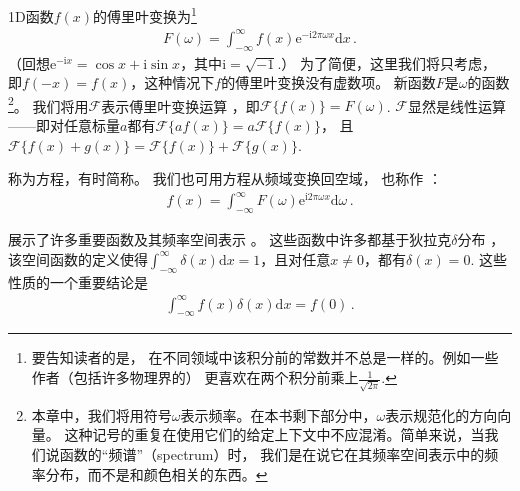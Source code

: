 1D函数$f(x)$的傅里叶变换为\footnote{要告知读者的是，
    在不同领域中该积分前的常数并不总是一样的。例如一些作者（包括许多物理界的）
    更喜欢在两个积分前乘上$\frac{1}{\sqrt{2\pi}}$.}
\begin{align}\label{eq:7.1}
    F(\omega)=\int_{-\infty}^{\infty}f(x)\mathrm{e}^{-\mathrm{i}2\pi\omega x}\mathrm{d}x\, .
\end{align}
（回想$\mathrm{e}^{-\mathrm{i}x}=\cos x+\mathrm{i}\sin x$，其中$\mathrm{i}=\sqrt{-1}$.）
为了简便，这里我们将只考虑，
即$f(-x)=f(x)$，这种情况下$f$的傅里叶变换没有虚数项。
新函数$F$是$\omega$的函数
\footnote{本章中，我们将用符号$\omega$表示频率。在本书剩下部分中，$\omega$表示规范化的方向向量。
    这种记号的重复在使用它们的给定上下文中不应混淆。简单来说，当我们说函数的“频谱”（spectrum）时，
    我们是在说它在其频率空间表示中的频率分布，而不是和颜色相关的东西。}。
我们将用$\mathcal{F}$表示傅里叶变换运算
，即$\mathcal{F}\{f(x)\}=F(\omega)$.
$\mathcal{F}$显然是线性运算——即对任意标量$a$都有$\mathcal{F}\{af(x)\}=a\mathcal{F}\{f(x)\}$，
且$\mathcal{F}\{f(x)+g(x)\}=\mathcal{F}\{f(x)\}+\mathcal{F}\{g(x)\}$.

称为方程，有时简称。
我们也可用方程从频域变换回空域，
也称作
：
\begin{align}\label{eq:7.2}
    f(x)=\int_{-\infty}^{\infty}F(\omega)\mathrm{e}^{\mathrm{i}2\pi\omega x}\mathrm{d}\omega\, .
\end{align}

展示了许多重要函数及其频率空间表示
。
这些函数中许多都基于狄拉克$\delta$分布
，
该空间函数的定义使得$\displaystyle\int_{-\infty}^{\infty}\delta(x)\mathrm{d}x=1$，且对任意$x\neq0$，都有$\delta(x)=0$.
这些性质的一个重要结论是
\begin{align*}
    \int_{-\infty}^{\infty} f(x)\delta(x)\mathrm{d}x=f(0)\, .
\end{align*}

